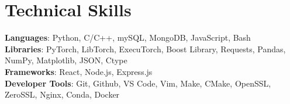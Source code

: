 \documentclass[letterpaper,11pt]{article}
\begin{document}
\section{Technical Skills}
 \begin{itemize}[leftmargin=0.15in, label={}]
    \small{ \item{
    \textbf{Languages}{: Python, C/C++, mySQL, MongoDB, JavaScript, Bash} \\
     \vspace{3pt} \textbf{Libraries}{: PyTorch, LibTorch, ExecuTorch, Boost Library, Requests, Pandas, NumPy, Matplotlib, JSON, Ctype} \\
     \vspace{3pt} \textbf{Frameworks}{: React, Node.js, Express.js} \\
     \vspace{3pt}\textbf{Developer Tools}{: Git, Github, VS Code, Vim, Make, CMake, OpenSSL, ZeroSSL, Nginx, Conda, Docker} \\
    } }
 \end{itemize}


\end{document}
